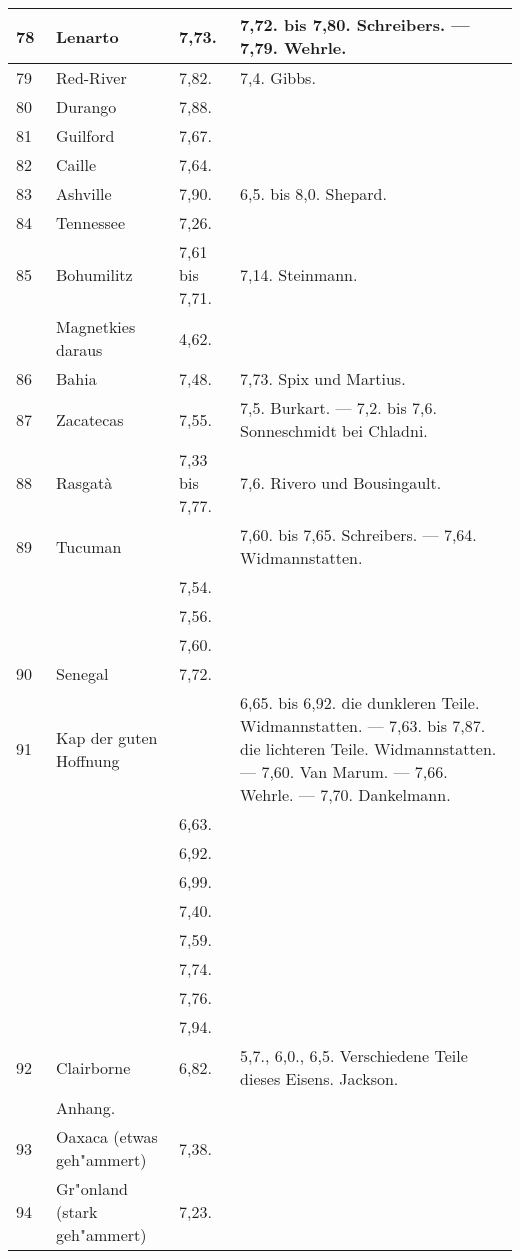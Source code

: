 \documentclass[a4paper, 11pt, oneside, polutonikogreek, german]{article}
\begin{document}
\begin{center}
\begin{longtable}{|p{7mm}|p{32mm}|p{30mm}|p{30mm}|}
        78 & Lenarto & 7,73. & 7,72. bis 7,80. Schreibers. --- 7,79. Wehrle. \\ \hline
        79 & Red-River & 7,82. & 7,4. Gibbs. \\ \hline
        80 & Durango & 7,88. & ~ \\ \hline
        81 & Guilford & 7,67. &  ~ \\ \hline
        82 & Caille & 7,64. & ~  \\ \hline
        83 & Ashville & 7,90. & 6,5. bis 8,0. Shepard. \\ \hline
        84 & Tennessee & 7,26. & ~  \\ \hline
        85 & Bohumilitz & 7,61 bis 7,71. & 7,14. Steinmann. \\ \hline
          & Magnetkies daraus & 4,62. & ~  \\ \hline
        86 & Bahia & 7,48. & 7,73. Spix und Martius. \\ \hline
        87 & Zacatecas & 7,55. & 7,5. Burkart. --- 7,2. bis 7,6. Sonneschmidt bei Chladni. \\ \hline
        88 & Rasgatà & 7,33 bis 7,77. & 7,6. Rivero und Bousingault. \\ \hline
        89 & Tucuman &   & 7,60. bis 7,65. Schreibers. --- 7,64. Widmannstatten. \\ \hline
         ~ &  ~ & 7,54. & ~  \\ \hline
         ~ & ~  & 7,56. & ~  \\ \hline
         ~ & ~  & 7,60. & ~  \\ \hline
        90 & Senegal & 7,72. &   \\ \hline
        91 & Kap der guten Hoffnung & ~ & 6,65. bis 6,92. die dunkleren Teile. Widmannstatten. --- 7,63. bis 7,87. die lichteren Teile. Widmannstatten. --- 7,60. Van Marum. --- 7,66. Wehrle. --- 7,70. Dankelmann. \\ \hline
         ~ &  ~ & 6,63. &  ~ \\ \hline
         ~~ & ~  & 6,92. & ~  \\ \hline
         ~ & ~  & 6,99. & ~  \\ \hline
         ~ & ~  & 7,40. & ~  \\ \hline
         ~ & ~  & 7,59. & ~  \\ \hline
        ~  & ~  & 7,74. & ~  \\ \hline
         ~ & ~  & 7,76. & ~  \\ \hline
       ~   & ~  & 7,94. & ~  \\ \hline
        92 & Clairborne & 6,82. & 5,7., 6,0., 6,5. Verschiedene Teile dieses Eisens. Jackson. \\ \hline
         ~ & Anhang. &  ~ &  ~ \\ \hline
        93 & Oaxaca (etwas geh"ammert) & 7,38. &   \\ \hline
        94 & Gr"onland (stark geh"ammert) & 7,23. & \\ \hline
    \end{longtable}
\end{center}
\clearpage
\end{document}
